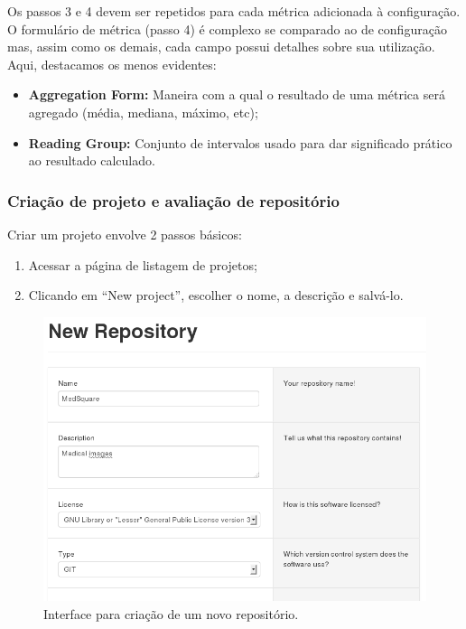 \documentclass{llncs}
\begin{document}
    Os passos 3 e 4 devem ser repetidos para cada métrica adicionada à configuração. O formulário de métrica (passo 4) é complexo se comparado ao de configuração mas, assim como os demais, cada campo possui detalhes sobre sua utilização. Aqui, destacamos os menos evidentes:
    \begin{itemize}
      \item \textbf{Aggregation Form:} Maneira com a qual o resultado de uma métrica será agregado (média, mediana, máximo, etc);
      \item \textbf{Reading Group:} Conjunto de intervalos usado para dar significado prático ao resultado calculado.
    \end{itemize}

    \subsubsection{Criação de projeto e avaliação de repositório}
    Criar um projeto envolve 2 passos básicos:
    \begin{enumerate}
      \item Acessar a página de listagem de projetos;
      \item Clicando em ``New project'', escolher o nome, a descrição e salvá-lo.
    \end{enumerate}

    \begin{figure}[H]
      \centering
      \includegraphics[width=\textwidth]{images/new-repository.png}
      \caption{Interface para criação de um novo repositório.}
      \label{fig:new-repository}
    \end{figure}
\end{document}
